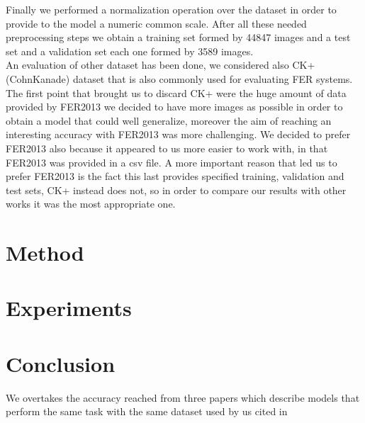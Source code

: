 \documentclass[10pt,twocolumn,letterpaper]{article}
\begin{document}
Finally we performed a normalization operation over the dataset in order to provide to the model a numeric common scale.
After all these needed preprocessing steps we obtain a training set formed by 44847 images and a test set and a validation set each one formed by 3589 images. 
\\An evaluation of other dataset has been done, we considered also CK+ (CohnKanade) dataset that is also commonly used for evaluating FER systems.
The first point that brought us to discard CK+ were the huge amount of data provided by FER2013 we decided to have more images as possible in order to 
obtain a model that could well generalize, moreover the aim of reaching an interesting accuracy with FER2013 was more challenging.
We decided to prefer FER2013 also because it appeared to us more easier to work with, in that FER2013 was provided in a csv file.
A more important reason that led us to prefer FER2013 is the fact this last provides specified training, validation and test sets, CK+ instead does not, so in order 
to compare our results with other works it was the most appropriate one.
\section{Method}
\section{Experiments}
\section{Conclusion}

We overtakes the accuracy reached from three papers which describe models that perform the same task with the same dataset used by us cited in \cite{paper}





{\small


}
\end{document}
